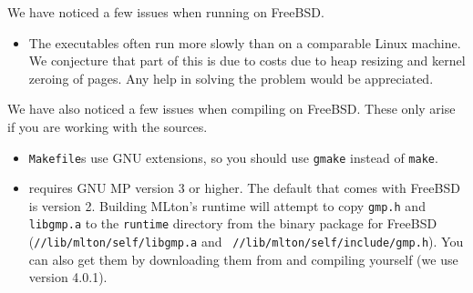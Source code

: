 
We have noticed a few issues when running {\mlton} on FreeBSD.  

\begin{itemize}

\item
The executables often run more slowly than on a comparable Linux
machine.  We conjecture that part of this is due to costs due to heap
resizing and kernel zeroing of pages.  Any help in solving the problem
would be appreciated.

\end{itemize}

We have also noticed a few issues when compiling {\mlton} on FreeBSD.  These
only arise if you are working with the {\mlton} sources.

\begin{itemize}

\item {\mlton} {\tt Makefile}s use GNU extensions, so you should use {\tt gmake}
instead of {\tt make}.

\item {\mlton} requires GNU MP version 3 or higher.  The default that comes with
FreeBSD is version 2.  Building MLton's runtime will attempt to copy
{\tt gmp.h} and {\tt libgmp.a} to the {\tt runtime} directory from the {\mlton}
binary package for FreeBSD ({\tt /\prefix/lib/mlton/self/libgmp.a} and {\tt
/\prefix/lib/mlton/self/include/gmp.h}).  You can also get them by
downloading them from  and
compiling yourself (we use version 4.0.1).
\end{itemize}
